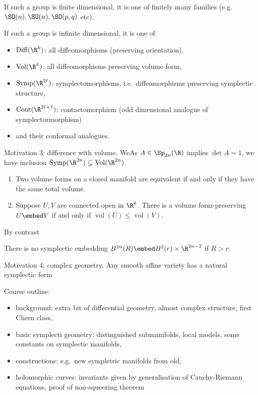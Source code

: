 \documentclass[a4paper]{article}
\begin{document}
\begin{theorem}[Lie]
  If such a group is finite dimensional, it is one of finitely many families (e.g.\ \(\SO(n), \SU(n), \SO(p, q)\) etc).
\end{theorem}

\begin{theorem}[Cartan]
  If such a group is infinite dimensional, it is one of
  \begin{itemize}
  \item \(\operatorname{Diff}(\R^k)\): all diffeomorphisms (preserving orientation),
  \item \(\operatorname{Vol}(\R^k)\): all diffeomorphisms preserving volume form,
  \item \(\operatorname{Symp}(\R^{2\ell})\): symplectomorphisms, i.e.\ diffeomorphisms preserving symplectic structure,
  \item \(\operatorname{Cont}(\R^{2\ell + 1})\): contactomorphism (odd dimensional analogue of symplectormorphism)
  \item and their conformal analogues.
  \end{itemize}
\end{theorem}

Motivation 3: difference with volume. WeAs \(A \in \Sp_{2n}(\R)\) implies \(\det A = 1\), we have inclusion \(\operatorname{Symp}(\R^{2n}) \subseteq \operatorname{Vol}(\R^{2n})\).

\begin{theorem}[Moser]\leavevmode
  \begin{enumerate}
  \item Two volume forms on a closed manifold are equivalent if and only if they have the same total volume.
  \item Suppose \(U, V\) are connected open in \(\R^k\). There is a volume form-preserving \(U \embed V\) if and only if \(\operatorname{vol}(U) \leq \operatorname{vol}(V)\).
  \end{enumerate}
\end{theorem}

By contrast

\begin{theorem}
  There is no symplectic embedding \(B^{2n}(R) \embed B^2(r) \times \R^{2n - 2}\) if \(R > r\).
\end{theorem}

Motivation 4: complex geometry. Any smooth affine variety has a natural symplectic form

Course outline:
\begin{itemize}
\item background: extra bit of differential geometry, almost complex structure, first Chern class,
\item basic symplecti geometry: distinguished submanifolds, local models, some constants on symplectic manifolds,
\item constructions: e.g.\ new sympletric manifolds from old,
\item holomorphic curves: invariants given by generalisation of Cauchy-Riemann equations, proof of non-squeezing theorem
\end{itemize}
\end{document}

